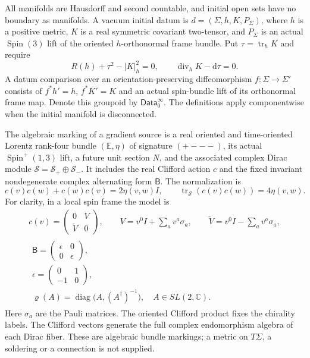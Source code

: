 \documentclass[
  english,
  11pt,
  reqno]{amsart}
\begin{document}
All manifolds are Hausdorff and second countable, and initial open sets
have no boundary as manifolds. A vacuum initial datum is
\(d=(\Sigma,h,K,P_\Sigma)\), where \(h\) is a positive metric, \(K\) is
a real symmetric covariant two-tensor, and \(P_\Sigma\) is an actual
\(\operatorname{Spin}(3)\) lift of the oriented \(h\)-orthonormal frame
bundle. Put \(\tau=\operatorname{tr}_hK\) and require%
 \[
R(h)+\tau^2-|K|_h^2=0,\qquad
\operatorname{div}_hK-\mathrm d\tau=0.
\] A datum comparison over an orientation-preserving diffeomorphism
\(f:\Sigma\to\Sigma'\) consists of \(f^*h'=h\), \(f^*K'=K\) and an
actual spin-bundle lift of its orthonormal frame map. Denote this
groupoid by \(\mathsf{Data}_0^\infty\). The definitions apply
componentwise when the initial manifold is disconnected.

The algebraic marking of a gradient source is a real oriented and
time-oriented Lorentz rank-four bundle \((\mathbb E,\eta)\) of signature
\((+---)\), its actual \(\operatorname{Spin}^{+}(1,3)\) lift, a future
unit section \(N\), and the associated complex Dirac module
\(\mathscr S=\mathscr S_+\oplus\mathscr S_-\). It includes the real
Clifford action \(c\) and the fixed invariant nondegenerate complex
alternating form \(\mathsf B\). The normalization is%
 \[
c(v)c(w)+c(w)c(v)=2\eta(v,w)I,\qquad
\operatorname{tr}_{\mathscr S}(c(v)c(w))=4\eta(v,w).
\] For clarity, in a local spin frame the model is%
 \[
\begin{gathered}
c(v)=
\begin{pmatrix}0&V\\ \widetilde V&0\end{pmatrix},
\qquad
V=v^0I+\sum_a v^a\sigma_a,\qquad
\widetilde V=v^0I-\sum_a v^a\sigma_a, \\
\begin{gathered}
\mathsf B=
\begin{pmatrix}\epsilon&0\\0&\epsilon\end{pmatrix}, \\
\epsilon=\begin{pmatrix}0&1\\-1&0\end{pmatrix}, \\
\varrho(A)=\operatorname{diag}\bigl(A,(A^\dagger)^{-1}\bigr),
\quad A\in SL(2,\mathbb C).
\end{gathered}
\end{gathered}
\] Here \(\sigma_a\) are the Pauli matrices. The oriented Clifford
product fixes the chirality labels. The Clifford vectors generate the
full complex endomorphism algebra of each Dirac fiber. These are
algebraic bundle markings; a metric on \(T\Sigma\), a soldering or a
connection is not supplied.
\end{document}
